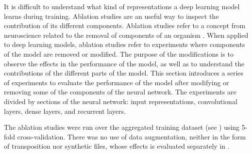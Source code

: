 
It is difficult to understand what kind of representations a
deep learning model learns during training. Ablation studies
are an useful way to inspect the contribution of its
different components. Ablation studies refer to a concept
from neuroscience related to the removal of components of an
organism \parencite{meyes2019ablation}. When applied to deep
learning models, ablation studies refer to experiments where
components of the model are removed or modified. The purpose
of the modifications is to observe the effects in the
performance of the model, as well as to understand the
contributions of the different parts of the model. This
section introduces a series of experiments to evaluate the
performance of the model after modifying or removing some of
the components of the neural network. The experiments are
divided by sections of the neural network: input
representations, convolutional layers, dense layers, and
recurrent layers.

The ablation studies were run over the aggregated training
dataset (see ) using 5-fold
cross-validation. There was no use of data augmentation,
neither in the form of transposition nor synthetic files,
whose effects is evaluated separately in
.
